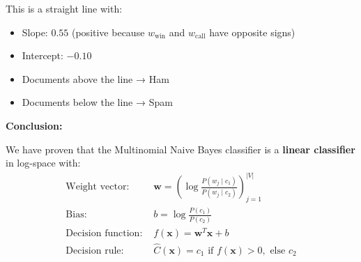 \documentclass[12pt]{article}
\begin{document}
\begin{solution}
This is a straight line with:
\begin{itemize}
    \item Slope: $0.55$ (positive because $w_{\text{win}}$ and $w_{\text{call}}$ have opposite signs)
    \item Intercept: $-0.10$
    \item Documents above the line → Ham
    \item Documents below the line → Spam
\end{itemize}

\textbf{Conclusion:}

We have proven that the Multinomial Naive Bayes classifier is a \textbf{linear classifier} in log-space with:
\[
\boxed{
\begin{aligned}
\text{Weight vector: } & \mathbf{w} = \left( \log \frac{P(w_j \mid c_1)}{P(w_j \mid c_2)} \right)_{j=1}^{|V|} \\
\text{Bias: } & b = \log \frac{P(c_1)}{P(c_2)} \\
\text{Decision function: } & f(\mathbf{x}) = \mathbf{w}^T \mathbf{x} + b \\
\text{Decision rule: } & \hat{C}(\mathbf{x}) = c_1 \text{ if } f(\mathbf{x}) > 0, \text{ else } c_2
\end{aligned}
}
\]
\end{solution}
\end{document}
